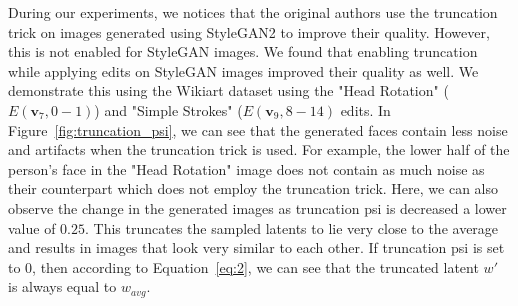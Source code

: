 During our experiments, we notices that the original authors use the truncation trick on images generated using StyleGAN2 to improve their quality. However, this is not enabled for StyleGAN images. We found that enabling truncation while applying edits on StyleGAN images improved their quality as well. We demonstrate this using the Wikiart dataset using the "Head Rotation" ($E(\textbf{v}_{7}, 0-1)$) and "Simple Strokes" ($E(\textbf{v}_{9}, 8-14)$ edits. In Figure~\ref{fig:truncation_psi}, we can see that the generated faces contain less noise and artifacts when the truncation trick is used. For example, the lower half of the person's face in the "Head Rotation" image does not contain as much noise as their counterpart which does not employ the truncation trick. Here, we can also observe the change in the generated images as truncation psi is decreased a lower value of $0.25$. This truncates the sampled latents to lie very close to the average and results in images that look very similar to each other. If truncation psi is set to $0$, then according to Equation~\ref{eq:2}, we can see that the truncated latent $w'$ is always equal to $w_{avg}$.

